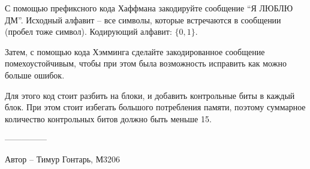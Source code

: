 \question
С помощью префиксного кода Хаффмана закодируйте сообщение “Я ЛЮБЛЮ ДМ”. Исходный алфавит – все символы, которые встречаются в сообщении (пробел тоже символ). Кодирующий алфавит: $\{0, 1\}$.

Затем, с помощью кода Хэмминга сделайте закодированное сообщение помехоустойчивым, чтобы при этом была возможность исправить как можно больше ошибок.

Для этого код стоит разбить на блоки, и добавить контрольные биты в каждый блок. При этом стоит избегать большого потребления памяти, поэтому суммарное количество контрольных битов должно быть меньше 15.

---------------

Автор -- Тимур Гонтарь, М3206